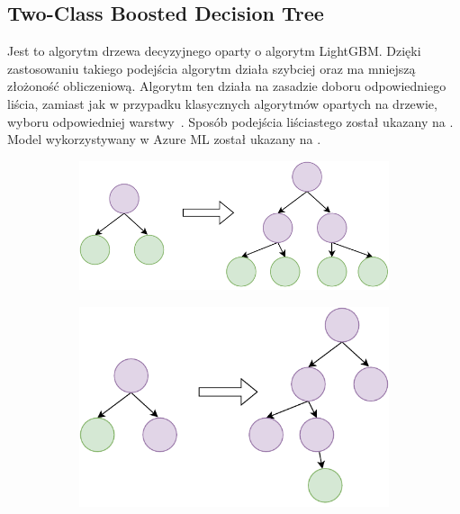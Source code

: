 \subsection{Two-Class Boosted Decision Tree}
Jest to algorytm drzewa decyzyjnego oparty o algorytm LightGBM. Dzięki zastosowaniu takiego podejścia algorytm działa szybciej oraz ma mniejszą złożoność obliczeniową. Algorytm ten działa na zasadzie doboru odpowiedniego liścia, zamiast jak w przypadku klasycznych algorytmów opartych na drzewie, wyboru odpowiedniej warstwy~\cite{LightGBM}. Sposób podejścia liściastego został ukazany na . Model wykorzystywany w Azure ML został ukazany na .
\vfill
\pagebreak
\begin{figure}[H]
    \begin{subfigure}[m]{\textwidth}
        \includegraphics[width=\textwidth]{images/level-wise}
    \end{subfigure}
    \begin{subfigure}[m]{\textwidth}
        \includegraphics[width=\textwidth]{images/leaf-wise}
    \end{subfigure}
    \label{fig:leaf}
\end{figure}

